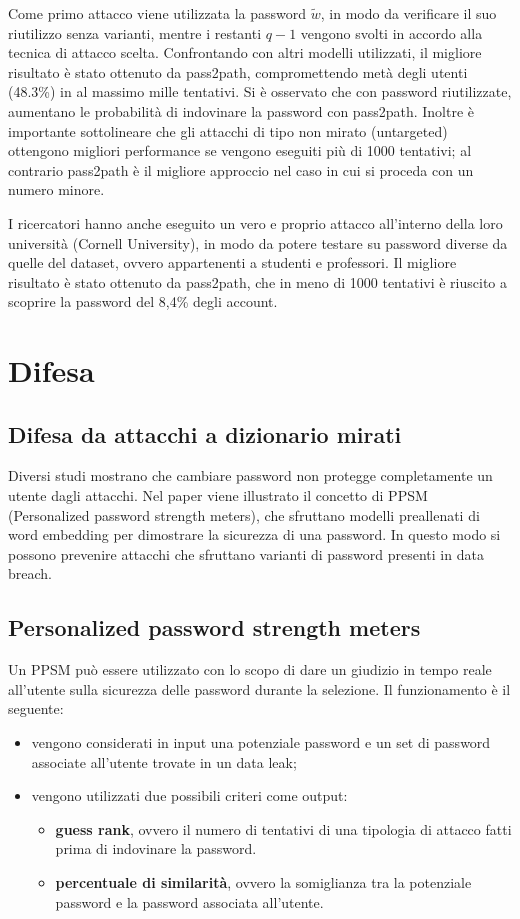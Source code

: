 Come primo attacco viene utilizzata la password $\tilde{w}$, in modo da verificare il suo riutilizzo senza varianti, mentre i restanti $q - 1$ vengono svolti in accordo alla tecnica di attacco scelta. Confrontando con altri modelli utilizzati, il migliore risultato è stato ottenuto da pass2path, compromettendo metà degli utenti (48.3\%) in al massimo mille tentativi.
Si è osservato che con password riutilizzate, aumentano le probabilità di indovinare la password con pass2path.
Inoltre è importante sottolineare che gli attacchi di tipo non mirato (untargeted) ottengono migliori performance se vengono eseguiti più di 1000 tentativi; al contrario pass2path è il migliore approccio nel caso in cui si proceda con un numero minore.


I ricercatori hanno anche eseguito un vero e proprio attacco all'interno della loro università (Cornell University), in modo da potere testare su password diverse da quelle del dataset, ovvero appartenenti a studenti e professori. Il migliore risultato è stato ottenuto da pass2path, che in meno di 1000 tentativi è riuscito a scoprire la password del 8,4\% degli account.


\section{Difesa}
\subsection{Difesa da attacchi a dizionario mirati}
Diversi studi mostrano che cambiare password non protegge completamente un utente dagli attacchi.
Nel paper viene illustrato il concetto di PPSM (Personalized password strength meters), che sfruttano modelli preallenati di word embedding per dimostrare la sicurezza di una password.
In questo modo si possono prevenire attacchi che sfruttano varianti di password presenti in data breach.

\subsection{Personalized password strength meters}
Un PPSM può essere utilizzato con lo scopo di dare un giudizio in tempo reale all'utente sulla sicurezza delle password durante la selezione.
Il funzionamento è il seguente:
\begin{itemize}
    \item vengono considerati in input una potenziale password e un set di password associate all'utente trovate in un data leak;
    \item vengono utilizzati due possibili criteri come output:
    \begin{itemize}
        \item \textbf{guess rank}, ovvero il numero di tentativi di una tipologia di attacco fatti prima di indovinare la password.
        \item \textbf{percentuale di similarità}, ovvero la somiglianza tra la potenziale password e la password associata all'utente.
    \end{itemize}
\end{itemize}

